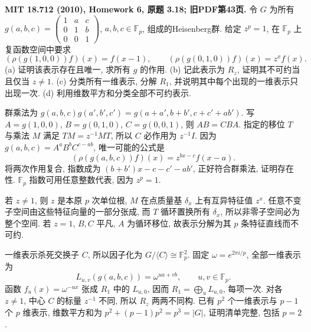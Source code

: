 \begin{exercise}\label{hw:3.18}
\textbf{MIT 18.712 (2010), Homework 6, 原题 3.18; 旧PDF第43页.}
令 $G$ 为所有 $g(a,b,c)=\begin{pmatrix}1&a&c\\0&1&b\\0&0&1\end{pmatrix}$, $a,b,c\in\mathbb F_p$, 组成的Heisenberg群. 给定 $z^p=1$, 在 $\mathbb F_p$ 上复函数空间中要求
\[
 (\rho(g(1,0,0))f)(x)=f(x-1),\qquad
 (\rho(g(0,1,0))f)(x)=z^xf(x).
\]
(a) 证明该表示存在且唯一, 求所有 $g$ 的作用.
(b) 记此表示为 $R_z$, 证明其不可约当且仅当 $z\ne1$.
(c) 分类所有一维表示, 分解 $R_1$, 并说明其中每个出现的一维表示只出现一次.
(d) 利用维数平方和分类全部不可约表示.
\end{exercise}
\begin{solution}
群乘法为 $g(a,b,c)g(a',b',c')=g(a+a',b+b',c+c'+ab')$. 写 $A=g(1,0,0)$, $B=g(0,1,0)$, $C=g(0,0,1)$, 则 $AB=CBA$. 指定的移位 $T$ 与乘法 $M$ 满足 $TM=z^{-1}MT$, 所以 $C$ 必作用为 $z^{-1}I$. 因为 $g(a,b,c)=A^aB^bC^{c-ab}$, 唯一可能的公式是
\[
 (\rho(g(a,b,c))f)(x)=z^{bx-c}f(x-a).             \tag{H6.1}
\]
将两次作用复合, 指数成为 $(b+b')x-c-c'-ab'$, 正好符合群乘法, 证明存在性. $\mathbb F_p$ 指数可用任意整数代表, 因为 $z^p=1$.

若 $z\ne1$, 则 $z$ 是本原 $p$ 次单位根, $M$ 在点质量基 $\delta_x$ 上有互异特征值 $z^x$. 任意不变子空间由这些特征向量的一部分张成, 而 $T$ 循环置换所有 $\delta_x$, 所以非零子空间必为整个空间. 若 $z=1$, $B,C$ 平凡, $A$ 为循环移位, 故表示分解为其 $p$ 条特征直线而不可约.

一维表示杀死交换子 $C$, 所以因子化为 $G/\langle C\rangle\cong\mathbb F_p^2$. 固定 $\omega=e^{2\pi i/p}$, 全部一维表示为
\[
 L_{u,v}(g(a,b,c))=\omega^{ua+vb},\qquad u,v\in\mathbb F_p.
\]
函数 $f_u(x)=\omega^{-ux}$ 张成 $R_1$ 中的 $L_{u,0}$, 因而 $R_1=\bigoplus_uL_{u,0}$, 每项一次. 对各 $z\ne1$, 中心 $C$ 的标量 $z^{-1}$ 不同, 所以 $R_z$ 两两不同构. 已有 $p^2$ 个一维表示与 $p-1$ 个 $p$ 维表示, 维数平方和为 $p^2+(p-1)p^2=p^3=|G|$, 证明清单完整, 包括 $p=2$.
\end{solution}

